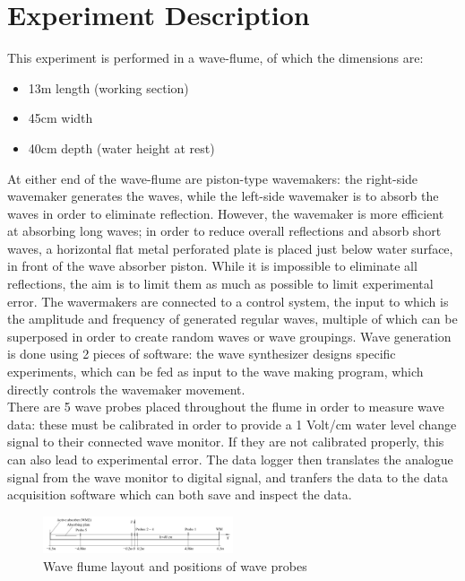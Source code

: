 \documentclass{article}
\begin{document}
	\section{Experiment Description}
	This experiment is performed in a wave-flume, of which the dimensions are:
	\begin{itemize}
		\item 13m length (working section)
		\item 45cm width
		\item 40cm depth (water height at rest)
	\end{itemize}
	At either end of the wave-flume are piston-type wavemakers: the right-side wavemaker generates the waves, while the left-side wavemaker is to absorb the waves in order to eliminate reflection. However, the wavemaker is more efficient at absorbing long waves; in order to reduce overall reflections and absorb short waves, a horizontal flat metal perforated plate is placed just below water surface, in front of the wave absorber piston. While it is impossible to eliminate all reflections, the aim is to limit them as much as possible to limit experimental error. The wavermakers are connected to a control system, the input to which is the amplitude and frequency of generated regular waves, multiple of which can be superposed in order to create random waves or wave groupings. Wave generation is done using 2 pieces of software: the wave synthesizer designs specific experiments, which can be fed as input to the wave making program, which directly controls the wavemaker movement.\\
	There are 5 wave probes placed throughout the flume in order to measure wave data: these must be calibrated in order to provide a 1 Volt/cm water level change signal to their connected wave monitor. If they are not calibrated properly, this can also lead to experimental error. The data logger then translates the analogue signal from the wave monitor to digital signal, and tranfers the data to the data acquisition software which can both save and inspect the data.\\
	\begin{figure}[H]
		\centering
		\includegraphics[clip, trim = 0 0.5cm 0 0.5cm,width=0.5\textwidth]{../graphs/experiment.png}
		\caption{Wave flume layout and positions of wave probes \cite{experimentdesc}}
		\label{experiment}
	\end{figure}
\end{document}
